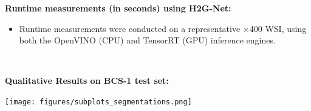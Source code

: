 \documentclass[portrait,a0paper,fontscale=0.292]{baposter}
\begin{document}
\begin{poster}
{\begin{minipage}[t]{0.5\textwidth}
        \vspace{1.0em}
        \textbf{\color{blue}Runtime measurements (in seconds) using H2G-Net:}\\ %
        \vspace{-0.9em}
        \begin{center}
        \end{center}
        \vspace{0.5em}
        \begin{itemize}
            \item Runtime measurements were conducted on a representative $\times$400 WSI, using both the OpenVINO (CPU) and TensorRT (GPU) inference engines.
        \end{itemize}
    \end{minipage}
    ~
    \begin{minipage}[t]{0.5\textwidth}
        \textbf{\color{blue}\hspace{12pt}Qualitative Results on BCS-1 test set:} \\[-1.5em]
        \begin{center}
            \texttt{[image: figures/subplots\_segmentations.png]}
        \end{center}
        

\end{minipage}}
\end{poster}
\end{document}
